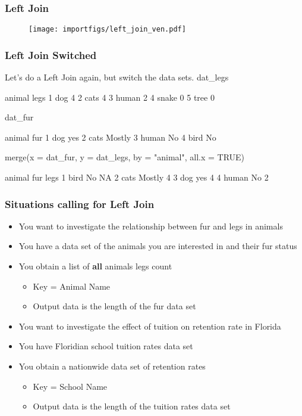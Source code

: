 \documentclass[10pt,american]{beamer}
\renewenvironment{Schunk}{}{}
\renewenvironment{Sinput}{}{}
\begin{document}
\begin{frame}[containsverbatim]
\frametitle{Left Join}
\begin{figure}
\texttt{[image: importfigs/left\_join\_ven.pdf]}
\end{figure}
\end{frame}



\begin{frame}
\frametitle{Left Join Switched}
Let's do a Left Join again, but switch the data sets.
\begin{Schunk}
\begin{Sinput}
 dat_legs
\end{Sinput}
\begin{Soutput}
  animal legs
1    dog    4
2   cats    4
3  human    2
4  snake    0
5   tree    0
\end{Soutput}
\begin{Sinput}
 dat_fur
\end{Sinput}
\begin{Soutput}
  animal    fur
1    dog    yes
2   cats Mostly
3  human     No
4   bird     No
\end{Soutput}
\begin{Sinput}
 merge(x = dat_fur, y = dat_legs, by = "animal", all.x = TRUE)
\end{Sinput}
\begin{Soutput}
  animal    fur legs
1   bird     No   NA
2   cats Mostly    4
3    dog    yes    4
4  human     No    2
\end{Soutput}
\end{Schunk}
\end{frame}


\begin{frame}
\frametitle{Situations calling for Left Join}
\begin{itemize}
\item You want to investigate the relationship between fur and legs in
  animals
\item You have a data set of the animals you are interested in and
  their fur status
\item You obtain a list of \textbf{all} animals legs count
\begin{itemize}
\item Key = Animal Name
\item Output data is the length of the fur data set
\end{itemize}
\item You want to investigate the effect of tuition on retention rate
  in Florida
\item You have Floridian school tuition rates data set
\item You obtain a nationwide data set of retention rates
\begin{itemize}
\item Key = School Name
\item Output data is the length of the tuition rates data set
\end{itemize}
\end{itemize}
\end{frame}
\end{document}

